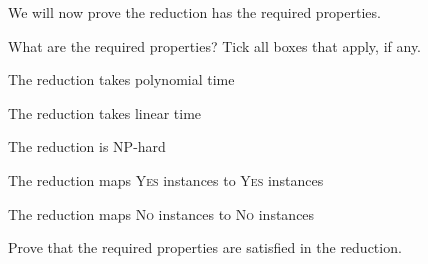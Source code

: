 \documentclass{article}
\begin{document}
\begin{Question}
\noindent We will now prove the reduction has the required properties.
\begin{Subquestion}
What are the required properties? Tick all boxes that apply, if any.
\begin{itemmultiplechoice}
\item The reduction takes polynomial time
\item The reduction takes linear time
\item The reduction is NP-hard
\item The reduction maps \textsc{Yes} instances to \textsc{Yes} instances
\item The reduction maps \textsc{No} instances to \textsc{No} instances
\end{itemmultiplechoice}
\end{Subquestion}

\begin{Subquestion}
Prove that the required properties are satisfied in the reduction.
\begin{makespace}
\vspace{70mm}
\end{makespace}
\end{Subquestion}
\end{Question}
\end{document}

